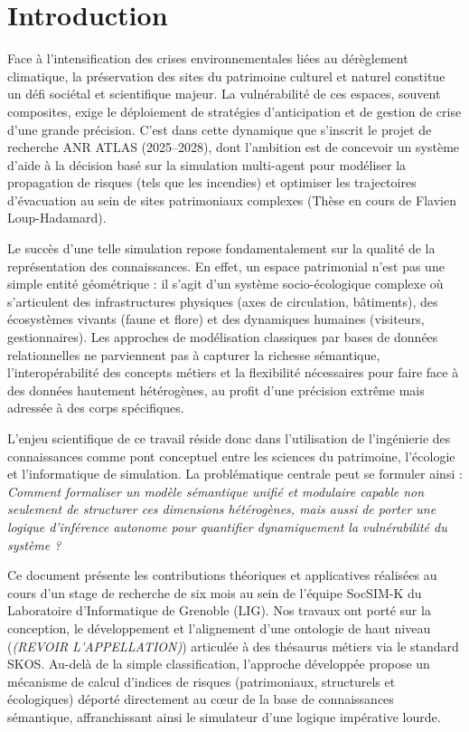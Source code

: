 \documentclass{article}
\begin{document}
\section*{Introduction}

Face à l'intensification des crises environnementales liées au dérèglement climatique, la préservation des sites du patrimoine culturel et naturel constitue un défi sociétal et scientifique majeur. La vulnérabilité de ces espaces, souvent composites, exige le déploiement de stratégies d'anticipation et de gestion de crise d'une grande précision. C'est dans cette dynamique que s'inscrit le projet de recherche ANR ATLAS (2025--2028), dont l'ambition est de concevoir un système d'aide à la décision basé sur la simulation multi-agent pour modéliser la propagation de risques (tels que les incendies) et optimiser les trajectoires d'évacuation au sein de sites patrimoniaux complexes (Thèse en cours de Flavien Loup-Hadamard).

Le succès d'une telle simulation repose fondamentalement sur la qualité de la représentation des connaissances. En effet, un espace patrimonial n'est pas une simple entité géométrique : il s'agit d'un système socio-écologique complexe où s'articulent des infrastructures physiques (axes de circulation, bâtiments), des écosystèmes vivants (faune et flore) et des dynamiques humaines (visiteurs, gestionnaires). Les approches de modélisation classiques par bases de données relationnelles ne parviennent pas à capturer la richesse sémantique, l'interopérabilité des concepts métiers et la flexibilité nécessaires pour faire face à des données hautement hétérogènes, au profit d'une précision extrême mais adressée à des corps spécifiques.

L'enjeu scientifique de ce travail réside donc dans l'utilisation de l'ingénierie des connaissances comme pont conceptuel entre les sciences du patrimoine, l'écologie et l'informatique de simulation. La problématique centrale peut se formuler ainsi : \textit{Comment formaliser un modèle sémantique unifié et modulaire capable non seulement de structurer ces dimensions hétérogènes, mais aussi de porter une logique d'inférence autonome pour quantifier dynamiquement la vulnérabilité du système ?}

Ce document présente les contributions théoriques et applicatives réalisées au cours d'un stage de recherche de six mois au sein de l'équipe SocSIM-K du Laboratoire d'Informatique de Grenoble (LIG). Nos travaux ont porté sur la conception, le développement et l'alignement d'une ontologie de haut niveau (\textit{\color{red}(REVOIR L'APPELLATION)}) articulée à des thésaurus métiers via le standard SKOS. Au-delà de la simple classification, l'approche développée propose un mécanisme de calcul d'indices de risques (patrimoniaux, structurels et écologiques) déporté directement au cœur de la base de connaissances sémantique, affranchissant ainsi le simulateur d'une logique impérative lourde.
\end{document}
